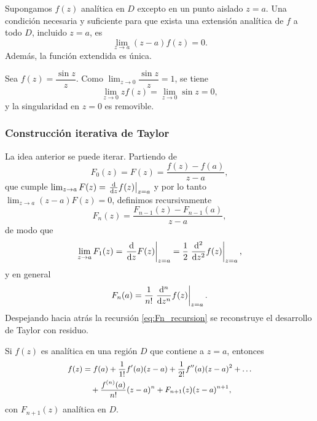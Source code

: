 \begin{teorema}
  \label{teo:singularidad_removible}
  Supongamos $f(z)$ anal\'itica en $D$ excepto en un punto aislado $z=a$. Una
  condici\'on necesaria y suficiente para que exista una extensi\'on
  anal\'itica de $f$ a todo $D$, incluido $z=a$, es
  \begin{equation}
    \label{eq:singularidad_removible}
    \lim_{z\rightarrow a}(z-a)f(z)=0 .
  \end{equation}
  Adem\'as, la funci\'on extendida es \'unica.
\end{teorema}

\begin{ejemplo}
  \label{ej:sinc}
  Sea $f(z)=\dfrac{\sin z}{z}$. Como
  $\lim_{z\rightarrow 0}\dfrac{\sin z}{z}=1$, se tiene
  \begin{equation}
    \label{eq:sinc}
    \lim_{z\rightarrow 0}zf(z)
      =\lim_{z\rightarrow 0}\sin z=0,
  \end{equation}
  y la singularidad en $z=0$ es removible.
\end{ejemplo}

\subsubsection{Construcci\'on iterativa de Taylor}
\label{subsubsec:construccion_taylor}

La idea anterior se puede iterar. Partiendo de
\begin{equation}
  \label{eq:F0}
  F_0(z)=F(z)=\frac{f(z)-f(a)}{z-a},
\end{equation}
que cumple $\lim_{z\rightarrow a}F(z)=\left. \frac{\mathrm{d}}{\mathrm{d}z}f(z) \right|_{z=a}$ y por lo
tanto $\lim_{z\rightarrow a}(z-a)F(z)=0$, definimos recursivamente
\begin{equation}
  \label{eq:Fn_recursion}
  F_n(z)=\frac{F_{n-1}(z)-F_{n-1}(a)}{z-a},
\end{equation}
de modo que
\begin{equation}
  \label{eq:limite_Fn}
  \lim_{z\rightarrow a}F_1(z)
    =\left. \frac{\mathrm{d}}{\mathrm{d}z}F(z) \right|_{z=a}
    =\frac{1}{2}\left. \frac{\mathrm{d}^2}{\mathrm{d}z^2}f(z) \right|_{z=a},
\end{equation}
y en general
\begin{equation}
  \label{eq:Fn_derivada}
  F_n(a)=\frac{1}{n!}\left. \frac{\mathrm{d}^{n}}{\mathrm{d}z^{n}}f(z) \right|_{z=a} .
\end{equation}
Despejando hacia atr\'as la recursi\'on \eqref{eq:Fn_recursion} se reconstruye
el desarrollo de Taylor con residuo.

\begin{teorema}
  \label{teo:taylor_residuo}
  Si $f(z)$ es anal\'itica en una regi\'on $D$ que contiene a $z=a$, entonces
  \begin{equation}
    \label{eq:taylor_residuo}
    \small
    \begin{aligned}
      f(z)&=f(a)+\frac{1}{1!}f'(a)(z-a)
        +\frac{1}{2!}f''(a)(z-a)^2+\dots\\
        &\quad+\frac{f^{(n)}(a)}{n!}(z-a)^n
        +F_{n+1}(z)(z-a)^{n+1},
    \end{aligned}
  \end{equation}
  con $F_{n+1}(z)$ anal\'itica en $D$.
\end{teorema}

